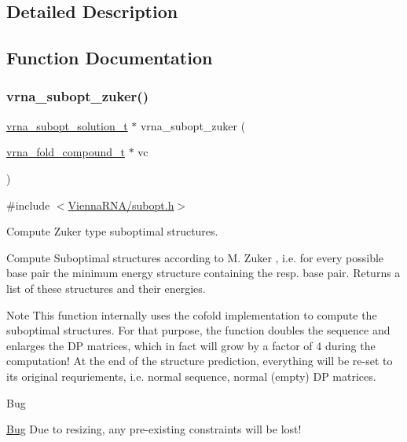 \subsection{Detailed Description}


\subsection{Function Documentation}
\mbox{\label{group__subopt__zuker_gababde9d210eb433854f1e71da7815fbb}} 
\subsubsection{\texorpdfstring{vrna\+\_\+subopt\+\_\+zuker()}{vrna\_subopt\_zuker()}}
{\footnotesize\ttfamily \hyperlink{subopt_8h_a01ae9a0f27d245d89f705afd843fc457}{vrna\+\_\+subopt\+\_\+solution\+\_\+t} $\ast$ vrna\+\_\+subopt\+\_\+zuker (\begin{DoxyParamCaption}\item[{\hyperlink{group__fold__compound_ga1b0cef17fd40466cef5968eaeeff6166}{vrna\+\_\+fold\+\_\+compound\+\_\+t} $\ast$}]{vc }\end{DoxyParamCaption})}



{\ttfamily \#include $<$\hyperlink{subopt_8h}{Vienna\+R\+N\+A/subopt.\+h}$>$}



Compute Zuker type suboptimal structures. 

Compute Suboptimal structures according to M. Zuker \cite{zuker:1989} , i.\+e. for every possible base pair the minimum energy structure containing the resp. base pair. Returns a list of these structures and their energies.

\begin{DoxyNote}{Note}
This function internally uses the cofold implementation to compute the suboptimal structures. For that purpose, the function doubles the sequence and enlarges the DP matrices, which in fact will grow by a factor of 4 during the computation! At the end of the structure prediction, everything will be re-\/set to its original requriements, i.\+e. normal sequence, normal (empty) DP matrices.
\end{DoxyNote}
\begin{DoxyRefDesc}{Bug}
\item[\hyperlink{bug__bug000001}{Bug}]Due to resizing, any pre-\/existing constraints will be lost!\end{DoxyRefDesc}


